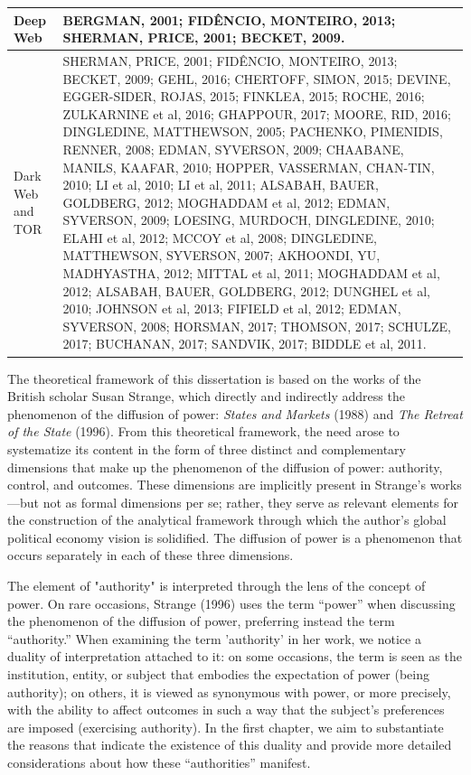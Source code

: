 \begin{longtable}[c]{|p{4cm}|p{11cm}|}
    \hline
    Deep Web & BERGMAN, 2001; FIDÊNCIO, MONTEIRO, 2013; SHERMAN, PRICE, 2001; BECKET, 2009. \\
    \hline
    Dark Web and TOR & SHERMAN, PRICE, 2001; FIDÊNCIO, MONTEIRO, 2013; BECKET, 2009; GEHL, 2016; CHERTOFF, SIMON, 2015; DEVINE, EGGER-SIDER, ROJAS, 2015; FINKLEA, 2015; ROCHE, 2016; ZULKARNINE et al, 2016; GHAPPOUR, 2017; MOORE, RID, 2016; DINGLEDINE, MATTHEWSON, 2005; PACHENKO, PIMENIDIS, RENNER, 2008; EDMAN, SYVERSON, 2009; CHAABANE, MANILS, KAAFAR, 2010; HOPPER, VASSERMAN, CHAN-TIN, 2010; LI et al, 2010; LI et al, 2011; ALSABAH, BAUER, GOLDBERG, 2012; MOGHADDAM et al, 2012; EDMAN, SYVERSON, 2009; LOESING, MURDOCH, DINGLEDINE, 2010; ELAHI et al, 2012; MCCOY et al, 2008; DINGLEDINE, MATTHEWSON, SYVERSON, 2007; AKHOONDI, YU, MADHYASTHA, 2012; MITTAL et al, 2011; MOGHADDAM et al, 2012; ALSABAH, BAUER, GOLDBERG, 2012; DUNGHEL et al, 2010; JOHNSON et al, 2013; FIFIELD et al, 2012; EDMAN, SYVERSON, 2008; HORSMAN, 2017; THOMSON, 2017; SCHULZE, 2017; BUCHANAN, 2017; SANDVIK, 2017; BIDDLE et al, 2011. \\
    \hline
\end{longtable}

The theoretical framework of this dissertation is based on the works of the British scholar Susan Strange, which directly and indirectly address the phenomenon of the diffusion of power: \textit{States and Markets} (1988) and \textit{The Retreat of the State} (1996). From this theoretical framework, the need arose to systematize its content in the form of three distinct and complementary dimensions that make up the phenomenon of the diffusion of power: authority, control, and outcomes. These dimensions are implicitly present in Strange's works—but not as formal dimensions per se; rather, they serve as relevant elements for the construction of the analytical framework through which the author's global political economy vision is solidified. The diffusion of power is a phenomenon that occurs separately in each of these three dimensions.

The element of "authority" is interpreted through the lens of the concept of power. On rare occasions, Strange (1996) uses the term “power” when discussing the phenomenon of the diffusion of power, preferring instead the term “authority.” When examining the term 'authority' in her work, we notice a duality of interpretation attached to it: on some occasions, the term is seen as the institution, entity, or subject that embodies the expectation of power (being authority); on others, it is viewed as synonymous with power, or more precisely, with the ability to affect outcomes in such a way that the subject's preferences are imposed (exercising authority). In the first chapter, we aim to substantiate the reasons that indicate the existence of this duality and provide more detailed considerations about how these “authorities” manifest.

